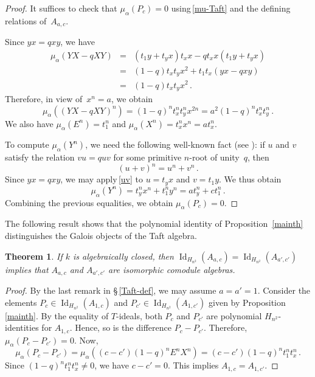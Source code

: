 \documentclass[11pt, a4paper]{amsart}
\newtheorem{theorem}{Theorem}[section]
\theoremstyle{definition}
\numberwithin{equation}{section}
\begin{document}
\begin{proof}
It suffices to check that $\mu_{\alpha}(P_c)= 0$ 
using\,\eqref{mu-Taft} and the defining relations of~$A_{a,c}$.

Since $yx = qxy$, we have
\begin{eqnarray*}
\mu_{\alpha}(YX- qXY) 
& = & (t_1 y + t_y x)t_x x - q t_x x (t_1 y + t_y x) \\
& = & (1-q) t_xt_y x^2 + t_1t_x (yx - q xy) \\
& = & (1-q) t_xt_y x^2 \, .
\end{eqnarray*}
Therefore, in view of~$x^n = a$, we obtain
\begin{equation*}
\mu_{\alpha}\left( (YX- qXY)^n \right) = (1-q)^n t_x^nt_y^n x^{2n} = a^2 (1-q)^n t_x^nt_y^n \, .
\end{equation*}
We also have $\mu_{\alpha}(E^n) = t_1^n$ and $\mu_{\alpha}(X^n) = t_x^n x^n = at_x^n$. 

To compute $\mu_{\alpha}(Y^n)$, we need the following well-known fact (see \cite[Lem\-ma~2.2]{Ma1}): 
if $u$ and $v$ satisfy the relation $vu = q uv$ for some primitive $n$-root of unity~$q$, then
\begin{equation}\label{uv}
(u+v)^n = u^n + v^n \, .
\end{equation}
Since $yx = qxy$, we may apply\,\eqref{uv} to $u= t_y x$ and $v = t_1 y$.
We thus obtain
\begin{equation*}
\mu_{\alpha}(Y^n) = t_y^n x^n + t_1^n y^n 
= a t_y^n + c t_1^n \, .
\end{equation*}
Combining the previous equalities, we obtain $\mu_{\alpha}(P_c) = 0$.
\end{proof}

The following result shows that the polynomial identity of Proposition~\ref{mainth} distinguishes
the Galois objects of the Taft algebra.

\begin{theorem}\label{maincor}
If $k$ is algebraically closed, then
$\operatorname{Id}_{H_{n^2}}(A_{a,c}) = \operatorname{Id}_{H_{n^2}}(A_{a',c'})$
implies that $A_{a,c}$ and $A_{a',c'}$ are isomorphic comodule algebras.
\end{theorem}

\begin{proof}
By the last remark in \S\,\ref{Taft-def}, we may assume $a=a'=1$.
Consider the elements $P_c \in \operatorname{Id}_{H_{n^2}}(A_{1,c})$ and $P_{c'} \in \operatorname{Id}_{H_{n^2}}(A_{1,c'})$
given by Proposition\,\ref{mainth}. By the equality of $T$-ideals, both $P_c$ and $P_{c'}$ 
are polynomial $H_{n^2}$-identities for $A_{1,c}$. Hence, so is the difference $P_c - P_{c'}$.
Therefore, $\mu_{\alpha}(P_c - P_{c'}) = 0$. Now, 
\begin{equation*}
\mu_{\alpha}(P_c - P_{c'})  = \mu_{\alpha}\left( (c-c') (1-q)^n E^nX^n \right) = 
(c-c') (1-q)^n t_1 ^n t_x^n \, .
\end{equation*}
Since $(1-q)^n t_1 ^n t_x^n \neq 0$, we have $c - c' = 0$.
This implies $A_{1,c} = A_{1,c'}$.
\end{proof}
\end{document}
